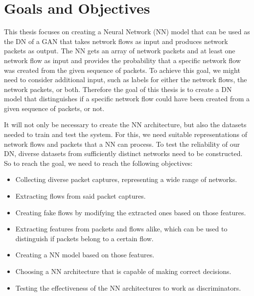 \documentclass[
	ngerman,
	ruledheaders=section,%
	class=report,%
	thesis={type=bachelor},%
	accentcolor=9c,%
	custommargins=true,%
	marginpar=false,%
	parskip=half-,%
	fontsize=11pt,%
]{tudapub}
\begin{document}
\section{Goals and Objectives}



This thesis focuses on creating a Neural Network (NN) model
that can be used as the DN of a GAN
that takes network flows as input and produces network packets as output.
The NN gets an array of network packets and at least one network flow as input
and provides the probability that a specific network flow was created from the given sequence of packets.
To achieve this goal, we might need to consider additional input,
such as labels for either the network flows, the network packets, or both.
Therefore the goal of this thesis is to create a DN model that distinguishes
if a specific network flow could have been created from a given sequence of packets, or not.

It will not only be necessary to create the NN architecture,
but also the datasets needed to train and test the system.
For this, we need suitable representations of network flows and packets that a NN can process.
To test the reliability of our DN, diverse datasets from sufficiently distinct networks need to be constructed.
So to reach the goal, we need to reach the following objectives:

\begin{itemize}
  \item Collecting diverse packet captures, representing a wide range of networks.
  \item Extracting flows from said packet captures.
  \item Creating fake flows by modifying the extracted ones based on those features.
  \item Extracting features from packets and flows alike,
which can be used to distinguish if packets belong to a certain flow.
  \item Creating a NN model based on those features.
  \item Choosing a NN architecture that is capable of making correct decisions.
  \item Testing the effectiveness of the NN architectures to work as discriminators.
\end{itemize}
\end{document}
